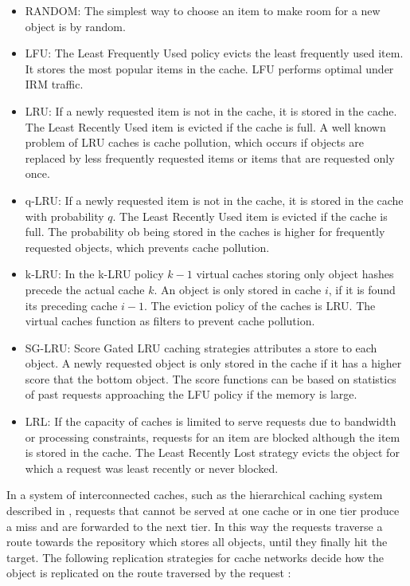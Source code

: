 \begin{itemize}
  \itemsep0em
  \item RANDOM: The simplest way to choose an item to make room for a new object is by random.
  \item LFU: The Least Frequently Used policy evicts the least frequently used item.
  It stores the most popular items in the cache.
  LFU performs optimal under IRM traffic.
  \item LRU: If a newly requested item is not in the cache, it is stored in the cache. The Least Recently Used item is evicted if the cache is full.
  A well known problem of LRU caches is cache pollution, which occurs if objects are replaced by less frequently requested items or items that are requested only once.
  \item q-LRU: If a newly requested item is not in the cache, it is stored in the cache with probability $q$. The Least Recently Used item is evicted if the cache is full.
  The probability ob being stored in the caches is higher for frequently requested objects, which prevents cache pollution. \cite{martina2014unified}
  \item k-LRU: In the k-LRU policy $k-1$ virtual caches storing only object hashes precede the actual cache $k$. An object is only stored in cache $i$, if it is found its preceding cache $i-1$. The eviction policy of the caches is LRU.
  The virtual caches function as filters to prevent cache pollution. \cite{martina2014unified}
  \item SG-LRU: Score Gated LRU caching strategies attributes a store to each object. A newly requested object is only stored in the cache if it has a higher score that the bottom object. The score functions can be based on statistics of past requests approaching the LFU policy if the memory is large. \cite{hasslinger2014caching}
  \item LRL: If the capacity of caches is limited to serve requests due to bandwidth or processing constraints, requests for an item are blocked although the item is stored in the cache. The Least Recently Lost strategy evicts the object for which a request was least recently or never blocked. \cite{leconte2014adaptive}
\end{itemize}

In a system of interconnected caches, such as the hierarchical caching system described in , requests that cannot be served at one cache or in one tier produce a miss and are forwarded to the next tier.
In this way the requests traverse a route towards the repository which stores all objects, until they finally hit the target.
The following replication strategies for cache networks decide how the object is replicated on the route traversed by the request \cite{rossini2014coupling,martina2014unified}:

